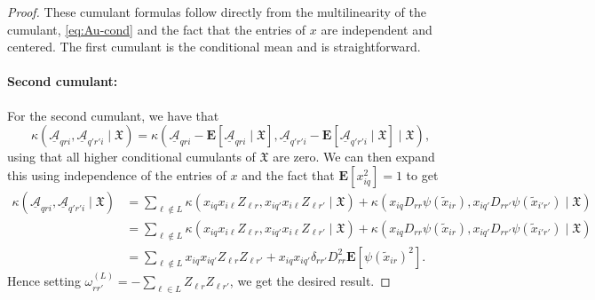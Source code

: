 \documentclass[letterpaper, 10pt, dvipsnames]{article}
\numberwithin{equation}{section}
\newcommand{\Au}{\underline{\mathcal{A}}}
\newcommand{\wt}{\widetilde}
\newcommand{\Eb}{\mathbf{E}}
\theoremstyle{definition}
\begin{document}
\begin{proof}
  These cumulant formulas follow directly from the multilinearity of the cumulant, \eqref{eq:Au-cond} and the fact that the entries of $x$ are independent and centered.
  The first cumulant is the conditional mean and is straightforward.
  
  \paragraph{Second cumulant:} For the second cumulant, we have that 
  \[
  \kappa( \Au_{qri},\Au_{q'r'i} \mid \mathfrak{X})
  =
  \kappa( \Au_{qri} - \Eb[\Au_{qri} \mid \mathfrak{X}],\Au_{q'r'i} - \Eb[\Au_{q'r'i} \mid \mathfrak{X}] \mid \mathfrak{X}),
  \]
  using that all higher conditional cumulants of $\mathfrak{X}$ are zero.  We can then expand this using independence of the entries of $x$ and the fact that $\Eb[x_{iq}^2] = 1$ to get 
  \[
  \begin{aligned}
  \kappa( \Au_{qri},\Au_{q'r'i} \mid \mathfrak{X})
  &=
  \sum_{\ell \notin L} \kappa( x_{iq}x_{i\ell}Z_{\ell r}, x_{iq'}x_{i\ell}Z_{\ell r'} \mid \mathfrak{X}) + \kappa(x_{iq}D_{rr}\psi(\wt{x}_{ir}), x_{iq'}D_{rr'}\psi(\wt{x}_{i'r'}) \mid \mathfrak{X}) \\
  &= 
  \sum_{\ell \notin L} \kappa( x_{iq}x_{i\ell}Z_{\ell r}, x_{iq'}x_{i\ell}Z_{\ell r'} \mid \mathfrak{X}) + \kappa(x_{iq}D_{rr}\psi(\wt{x}_{ir}), x_{iq'}D_{rr'}\psi(\wt{x}_{i'r'}) \mid \mathfrak{X}) \\
  &= 
  \sum_{\ell \notin L} x_{iq}x_{iq'} Z_{\ell r}Z_{\ell r'} + x_{iq}x_{iq'} \delta_{r r'} D_{rr}^2\Eb[ \psi(\wt{x}_{ir})^2].
  \end{aligned}
  \]
  Hence setting $\omega^{(L)}_{rr'}= -\sum_{\ell \in L} Z_{\ell r}Z_{\ell r'}$, we get the desired result.
  

\end{proof}
\end{document}
